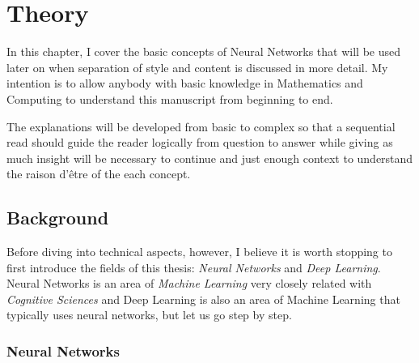 
\chapter{Theory}
\label{chap:theory}


In this chapter, I cover the basic concepts of Neural Networks that will be used later on when separation of style and content is discussed in more detail.
My intention is to allow anybody with basic knowledge in Mathematics and Computing to understand this manuscript from beginning to end.

The explanations will be developed from basic to complex so that a sequential read should guide the reader logically from question to answer while giving as much insight will be necessary to continue and just enough context to understand the raison d'être of the each concept.



\section{Background}
\label{sec:theory:background}

Before diving into technical aspects, however, I believe it is worth stopping to first introduce the fields of this thesis: \emph{Neural Networks} and \emph{Deep Learning}.
Neural Networks is an area of \emph{Machine Learning} very closely related with \emph{Cognitive Sciences} and Deep Learning is also an area of Machine Learning that typically uses neural networks, but let us go step by step.


\subsection{Neural Networks}
\label{sub:theory:background:neural-networks}

